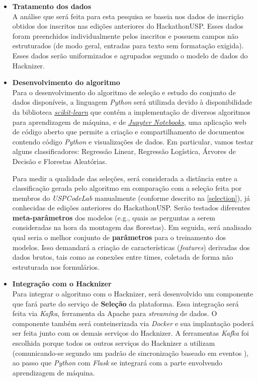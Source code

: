 \documentclass[10pt,twoside,a4paper]{article}
\begin{document}
      \begin{itemize}
          \item \textbf{Tratamento dos dados} \\
          A análise que será feita para esta pesquisa se baseia nos dados de inscrição obtidos dos inscritos nas edições anteriores do HackathonUSP. Esses dados foram preenchidos individualmente pelos inscritos e possuem campos não estruturados (de modo geral, entradas para texto sem formatação exigida). Esses dados serão uniformizados e agrupados segundo o modelo de dados do Hacknizer.
      
          \item \textbf{Desenvolvimento do algoritmo} \\
          Para o desenvolvimento do algoritmo de seleção e estudo do conjunto de dados disponíveis, a linguagem \textit{Python} será utilizada devido à disponibilidade da biblioteca \href{http://scikit-learn.org}{\textit{scikit-learn}} que contém a implementação de diversos algoritmos para aprendizagem de máquina, e de \href{http://jupyter.org/}{\textit{Jupyter Notebooks}}, uma aplicação web de código aberto que permite a criação e compartilhamento de documentos contendo código \textit{Python} e visualizações de dados. Em particular, vamos testar alguns classificadores: Regressão Linear, Regressão Logística, Árvores de Decisão e Florestas Aleatórias.
          
          Para medir a qualidade das seleções, será considerada a distância entre a classificação gerada pelo algoritmo em comparação com a seleção feita por membros do \textit{USPCodeLab} manualmente (conforme descrito na \autoref{selection}), já conhecidas de edições anteriores do HackathonUSP.
          Serão testados diferentes \textbf{meta-parâmetros} dos modelos (e.g., quais as perguntas a serem consideradas na hora da montagem das florestas). Em seguida, será analisado qual seria o melhor conjunto de \textbf{parâmetros} para o treinamento dos modelos. Isso demandará a criação de características (\textit{features}) derivadas dos dados brutos, tais como as conexões entre times, coletada de forma não estruturada nos formulários.
          
          \item \textbf{Integração com o Hacknizer} \\
          Para integrar o algoritmo com o Hacknizer, será desenvolvido um componente que fará parte do serviço de \textbf{Seleção} da plataforma. Essa integração será feita via \textit{Kafka}, ferramenta da Apache para \textit{streaming} de dados. O componente também será conteinerizada via \textit{Docker} e sua implantação poderá ser feita junto com os demais serviços do Hacknizer.
          A ferramentas \textit{Kafka} foi escolhida porque todos os outros serviços do Hacknizer a utilizam (comunicando-se segundo um padrão de sincronização baseado em eventos \cite{Newman2015BuildingSystems}), ao passo que \textit{Python} com \textit{Flask} se integrará com a parte envolvendo aprendizagem de máquina.
      \end{itemize}
    
\end{document}
